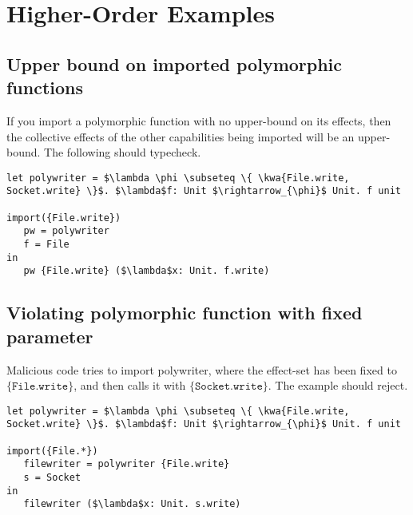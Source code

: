 \documentclass{llncs}
\newcommand{\keywadj}[1]{\mathtt{#1}}
\newcommand{\kwa}[1]{\keywadj{ #1 }}
\begin{document}
\section{Higher-Order Examples}

\subsection*{Upper bound on imported polymorphic functions}

If you import a polymorphic function with no upper-bound on its effects, then the collective effects of the other capabilities being imported will be an upper-bound. The following should typecheck.

\begin{lstlisting}
let polywriter = $\lambda \phi \subseteq \{ \kwa{File.write, Socket.write} \}$. $\lambda$f: Unit $\rightarrow_{\phi}$ Unit. f unit

import({File.write}) 
   pw = polywriter
   f = File
in
   pw {File.write} ($\lambda$x: Unit. f.write)
\end{lstlisting}

\subsection*{Violating polymorphic function with fixed parameter}

Malicious code tries to import polywriter, where the effect-set has been fixed to $\{ \kwa{File.write} \}$, and then calls it with $\kwa{ \{Socket.write\} }$. The example should reject.

\begin{lstlisting}
let polywriter = $\lambda \phi \subseteq \{ \kwa{File.write, Socket.write} \}$. $\lambda$f: Unit $\rightarrow_{\phi}$ Unit. f unit

import({File.*})
   filewriter = polywriter {File.write}
   s = Socket
in
   filewriter ($\lambda$x: Unit. s.write)
\end{lstlisting}









\end{document}
